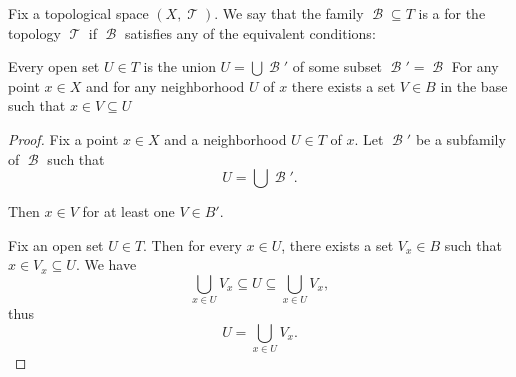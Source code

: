 \begin{definition}\label{def:topological_base}
  Fix a topological space \( (X, \mscrT) \). We say that the family \( \mscrB \subseteq T \) is a  for the topology \( \mscrT \) if \( \mscrB \) satisfies any of the equivalent conditions:
  \begin{thmenum}
     Every open set \( U \in T \) is the union \( U = \bigcup \mscrB' \) of some subset \( \mscrB' = \mscrB \)
     For any point \( x \in X \) and for any neighborhood \( U \) of \( x \) there exists a set \( V \in B \) in the base such that \( x \in V \subseteq U \)
  \end{thmenum}
\end{definition}
\begin{proof}
   Fix a point \( x \in X \) and a neighborhood \( U \in T \) of \( x \). Let \( \mscrB' \) be a subfamily of \( \mscrB \) such that
  \begin{equation*}
    U = \bigcup \mscrB'.
  \end{equation*}

  Then \( x \in V \) for at least one \( V \in B' \).

   Fix an open set \( U \in T \). Then for every \( x \in U \), there exists a set \( V_x \in B \) such that \( x \in V_x \subseteq U \). We have
  \begin{equation*}
    \bigcup_{x \in U} V_x \subseteq U \subseteq \bigcup_{x \in U} V_x,
  \end{equation*}
  thus
  \begin{equation*}
    U = \bigcup_{x \in U} V_x.
  \end{equation*}
\end{proof}

